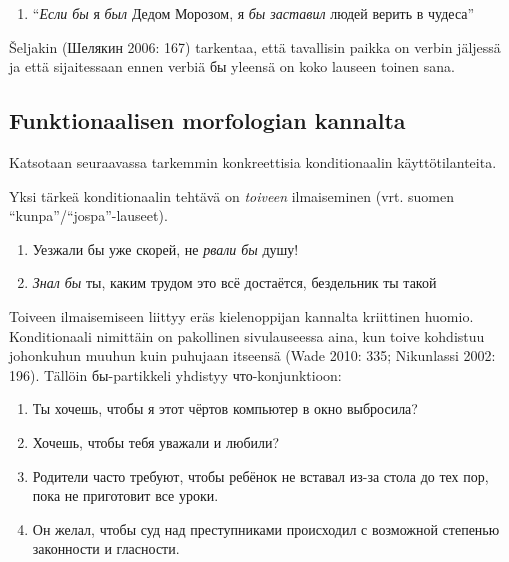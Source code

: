 \documentclass[]{scrreprt}
\providecommand{\tightlist}{%
  \setlength{\itemsep}{0pt}\setlength{\parskip}{0pt}}
\begin{document}
\begin{enumerate}
\def\labelenumi{(\arabic{enumi})}
\setcounter{enumi}{381}
\tightlist
\item
  ``\emph{Если бы} я \emph{был} Дедом Морозом, я \emph{бы заставил}
  людей верить в чудеса''
\end{enumerate}

Šeljakin (Шелякин 2006: 167) tarkentaa, että tavallisin paikka on verbin
jäljessä ja että sijaitessaan ennen verbiä бы yleensä on koko lauseen
toinen sana.

\subsection{Funktionaalisen morfologian
kannalta}\label{funktionaalisen-morfologian-kannalta}

Katsotaan seuraavassa tarkemmin konkreettisia konditionaalin
käyttötilanteita.

Yksi tärkeä konditionaalin tehtävä on \emph{toiveen} ilmaiseminen (vrt.
suomen ``kunpa''/``jospa''-lauseet).

\begin{enumerate}
\def\labelenumi{(\arabic{enumi})}
\setcounter{enumi}{382}
\tightlist
\item
  Уезжали бы уже скорей, не \emph{рвали бы} душу!
\item
  \emph{Знал бы} ты, каким трудом это всё достаётся, бездельник ты такой
\end{enumerate}

Toiveen ilmaisemiseen liittyy eräs kielenoppijan kannalta kriittinen
huomio. Konditionaali nimittäin on pakollinen sivulauseessa aina, kun
toive kohdistuu johonkuhun muuhun kuin puhujaan itseensä (Wade 2010:
335; Nikunlassi 2002: 196). Tällöin бы-partikkeli yhdistyy
что-konjunktioon:

\begin{enumerate}
\def\labelenumi{(\arabic{enumi})}
\setcounter{enumi}{384}
\tightlist
\item
  Ты хочешь, чтобы я этот чёртов компьютер в окно выбросила?
\item
  Хочешь, чтобы тебя уважали и любили?
\item
  Родители часто требуют, чтобы ребёнок не вставал из-за стола до тех
  пор, пока не приготовит все уроки.
\item
  Он желал, чтобы суд над преступниками происходил с возможной степенью
  законности и гласности.
\end{enumerate}
\end{document}
